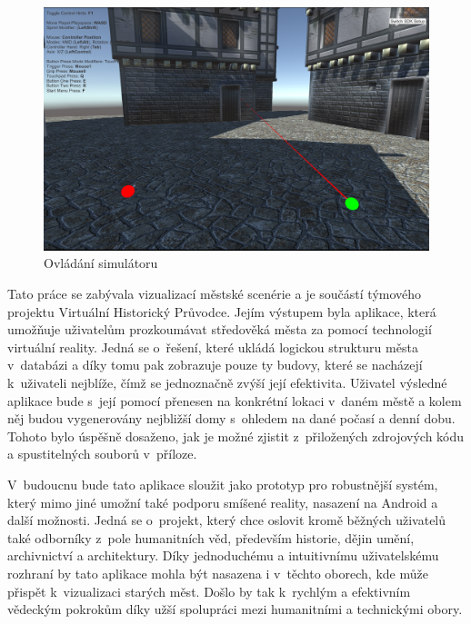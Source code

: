 \documentclass[thesis=B,czech]{FITthesis}[2012/06/26]
\begin{document}
\begin{figure}
  		\includegraphics[width=\textwidth,height=\textheight,keepaspectratio]{screen2.png}
  		\caption{Ovládání simulátoru}
  		\label{fig:simulator}
	\end{figure}




\begin{conclusion}
	   
    Tato práce se zabývala vizualizací městské scenérie a je součástí týmového projektu Virtuální Historický Průvodce. Jejím výstupem byla aplikace, která umožňuje uživatelům prozkoumávat středověká města za pomocí technologií virtuální reality. Jedná se o~řešení, které ukládá  logickou strukturu města v~databázi a díky tomu pak zobrazuje pouze ty budovy, které se nacházejí k~uživateli nejblíže, čímž se jednoznačně zvýší její efektivita. Uživatel výsledné aplikace bude s~její pomocí přenesen na konkrétní lokaci v~daném městě a kolem něj budou vygenerovány nejbližší domy s~ohledem na dané počasí a denní dobu.  Tohoto bylo úspěšně dosaženo, jak je možné zjistit z~přiložených zdrojových kódu a spustitelných souborů v~příloze.
    
     V~budoucnu bude tato aplikace sloužit jako prototyp pro robustnější systém, který mimo jiné umožní také podporu smíšené reality, nasazení na Android a další možnosti. Jedná se o~projekt, který chce oslovit kromě běžných uživatelů také odborníky z~pole humanitních věd, především historie, dějin umění, archivnictví a architektury. Díky jednoduchému a intuitivnímu uživatelskému rozhraní by tato aplikace mohla být nasazena i v~těchto oborech, kde může přispět k~vizualizaci starých měst. Došlo by tak k~rychlým a efektivním vědeckým pokrokům díky užší spolupráci mezi humanitními a technickými obory.
\end{conclusion}
\end{document}
